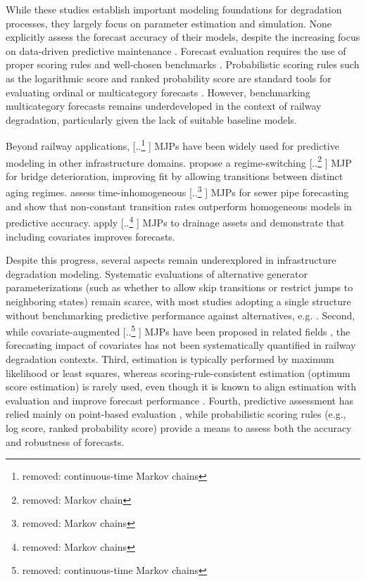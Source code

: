 \documentclass{article}
\providecommand{\DIFadd}[1]{{\protect\color{blue} \sf #1}} %
\providecommand{\DIFdel}[1]{{\protect\color{red} [..\footnote{removed: #1} ]}} %
\providecommand{\DIFaddbegin}{} %
\providecommand{\DIFaddend}{} %
\providecommand{\DIFdelbegin}{} %
\providecommand{\DIFdelend}{} %
\begin{document}
While these studies establish important modeling foundations for degradation processes, they largely focus on parameter estimation and simulation. None explicitly assess the forecast accuracy of their models, despite the increasing focus on data-driven predictive maintenance \citep{Binder2023}. Forecast evaluation requires the use of proper scoring rules \citep{Gneiting2007} and well-chosen benchmarks \citep{Hyndman2014}. Probabilistic scoring rules such as the logarithmic score and ranked probability score are standard tools for evaluating ordinal or multicategory forecasts \citep{Epstein1969,friedman1983a}. However, benchmarking multicategory forecasts remains underdeveloped in the context of railway degradation, particularly given the lack of suitable baseline models.

Beyond railway applications, \DIFdelbegin \DIFdel{continuous-time Markov chains }\DIFdelend \DIFaddbegin \DIFadd{MJPs }\DIFaddend have been widely used for predictive modeling in other infrastructure domains. \citet{Mizutani2023RegimeSwitching} propose a regime-switching \DIFdelbegin \DIFdel{Markov chain }\DIFdelend \DIFaddbegin \DIFadd{MJP }\DIFaddend for bridge deterioration, improving fit by allowing transitions between distinct aging regimes. \citet{JimenezRoa2024Nonhomogeneous} assess time-inhomogeneous \DIFdelbegin \DIFdel{Markov chains }\DIFdelend \DIFaddbegin \DIFadd{MJPs }\DIFaddend for sewer pipe forecasting and show that non-constant transition rates outperform homogeneous models in predictive accuracy. \citet{Wu2021ConditionPrediction} apply \DIFdelbegin \DIFdel{Markov chains }\DIFdelend \DIFaddbegin \DIFadd{MJPs }\DIFaddend to drainage assets and demonstrate that including covariates improves forecasts. %

Despite this progress, several aspects remain underexplored in infrastructure degradation modeling.
Systematic evaluations of alternative generator parameterizations (such as whether to allow skip transitions or restrict jumps to neighboring states) remain scarce, with most studies adopting a single structure without benchmarking predictive performance against alternatives, e.g. \citep{bisgaard2024A,Zbiciak2025}.
Second, while covariate-augmented \DIFdelbegin \DIFdel{continuous-time Markov chains }\DIFdelend \DIFaddbegin \DIFadd{MJPs }\DIFaddend have been proposed in related fields \citep{Wu2021ConditionPrediction}, the forecasting impact of covariates has not been systematically quantified in railway degradation contexts.
Third, estimation is typically performed by maximum likelihood or least squares, whereas scoring-rule-consistent estimation (optimum score estimation) is rarely used, even though it is known to align estimation with evaluation and improve forecast performance \citep{Gneiting2007,friedman1983a,Copas1983}.
Fourth, predictive assessment has relied mainly on point-based evaluation \citep{JimenezRoa2024Nonhomogeneous,Mizutani2023RegimeSwitching}, while probabilistic scoring rules (e.g., log score, ranked probability score) provide a means to assess both the accuracy and robustness of forecasts.
\end{document}
